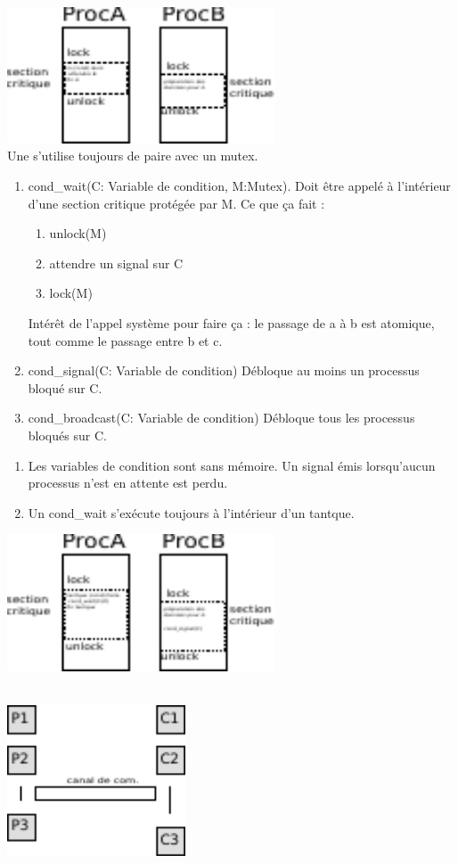  \\
\includegraphics[width=300px]{fig32.pdf}\\

 Une  s'utilise toujours de paire avec un mutex. \\

\begin{enumerate}
	\item cond\_wait(C: Variable de condition, M:Mutex). Doit être appelé à l'intérieur d'une section critique protégée par M. Ce que ça fait :
	\begin{enumerate}	
		\item unlock(M)
		\item attendre un signal sur C
		\item lock(M)
	\end{enumerate}
	Intérêt de l'appel système pour faire ça : le passage de a à b est atomique, tout comme le passage entre b et c.
	\item cond\_signal(C: Variable de condition) Débloque au moins un processus bloqué sur C.
	\item cond\_broadcast(C: Variable de condition) Débloque tous les processus bloqués sur C.
\end{enumerate}

\begin{enumerate}
	\item Les variables de condition sont sans mémoire. Un signal émis lorsqu'aucun processus n'est en attente est perdu.
	\item Un cond\_wait s'exécute toujours à l'intérieur d'un tantque.
\end{enumerate} 

\includegraphics[width=300px]{fig33.pdf}\newpage

\\
\includegraphics[width=200px]{fig34.pdf}\\
